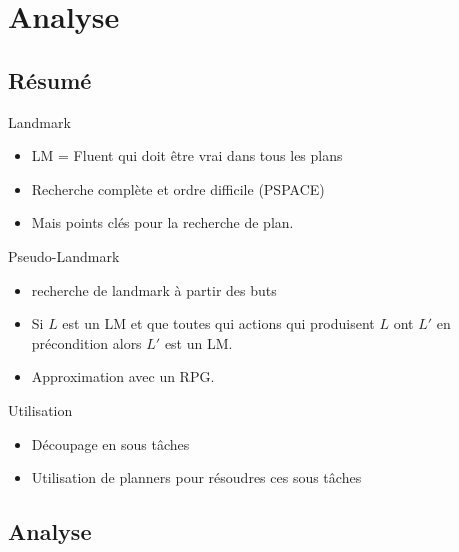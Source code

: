 \section{Analyse}
  \subsection*{Résumé}

\begin{frame}
  \begin{block}{Landmark}
    \begin{itemize}
      \item LM = Fluent qui doit être vrai dans tous les plans
      \item Recherche complète et ordre difficile (PSPACE)
      \item Mais points clés pour la recherche de plan.
    \end{itemize}
  \end{block}

  \begin{block}{Pseudo-Landmark}
    \begin{itemize}
      \item recherche de landmark à partir des buts
      \item Si $L$ est un LM et que toutes qui actions qui produisent $L$ ont $L'$ en précondition alors $L'$ est un LM.
      \item Approximation avec un RPG.
    \end{itemize}
  \end{block}
\end{frame}

\begin{frame}
  \begin{block}{Utilisation}
    \begin{itemize}
      \item Découpage en sous tâches
      \item Utilisation de planners pour résoudres ces sous tâches
    \end{itemize}
  \end{block}
\end{frame}

  \subsection*{Analyse}


